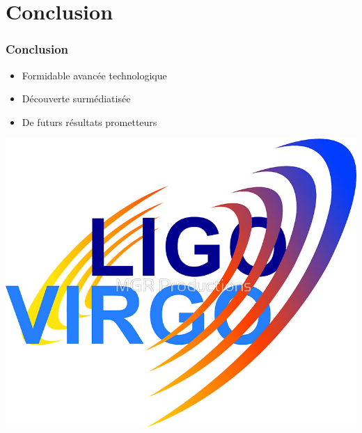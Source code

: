 \documentclass{beamer}
\begin{document}
\section{Conclusion}
\begin{frame}
	\frametitle{Conclusion}
	\begin{itemize}
		\item Formidable avancée technologique
		\item Découverte surmédiatisée
		\item De futurs résultats prometteurs
	\end{itemize}
	\center\includegraphics[scale=0.1]{Docs/ligo.jpeg}
\end{frame}
\end{document}
